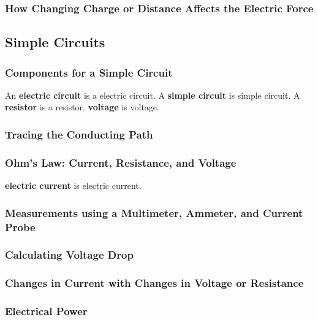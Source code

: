 \documentclass[dvipsnames]{article}
\begin{document}
\subsubsection{How Changing Charge or Distance Affects the Electric Force}


\clearpage

\subsection{Simple Circuits}

\subsubsection{Components for a Simple Circuit}
An \textbf{\gls{electric circuit}} is a \glsdesc{electric circuit}. A \textbf{\gls{simple circuit}} is \glsdesc{simple circuit}. A \textbf{\gls{resistor}} is a \glsdesc{resistor}. \textbf{\Gls{voltage}} is \glsdesc{voltage}.

\subsubsection{Tracing the Conducting Path}

\subsubsection{Ohm's Law: Current, Resistance, and Voltage}

\textbf{\Gls{electric current}} is \glsdesc{electric current}.

\subsubsection{Measurements using a Multimeter, Ammeter, and Current Probe}

\subsubsection{Calculating Voltage Drop}

\subsubsection{Changes in Current with Changes in Voltage or Resistance}

\subsubsection{Electrical Power}
\end{document}
